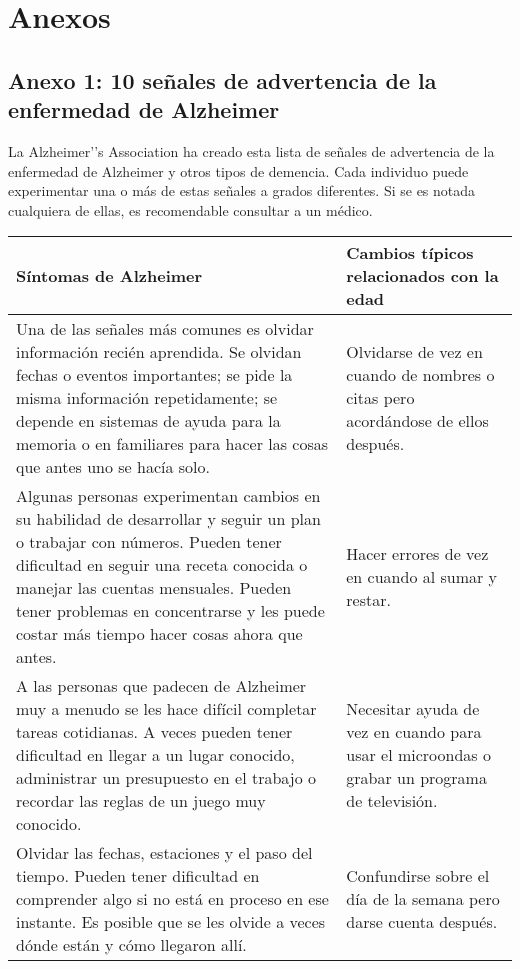 \documentclass[smallextended, 12pt]{article}
\begin{document}
	\section{Anexos}
	\subsection{Anexo 1: 10 se\~nales de advertencia de la enfermedad de Alzheimer}
	La Alzheimer'’s Association ha creado esta lista de se\~nales de advertencia de la enfermedad de Alzheimer y otros tipos de demencia. Cada individuo puede experimentar una o m\'as de estas se\~nales a grados diferentes. Si se es notada cualquiera de ellas, es recomendable consultar a un m\'edico. \cite{ref7}
	\begin{center}
		\begin{tabular}{|p{10cm}|p{7cm}|}
			\hline
			\textbf{S\'intomas de Alzheimer }&\textbf{ Cambios t\'ipicos relacionados con la edad} \\
			\hline
			
			Una de las se\~nales m\'as comunes es olvidar informaci\'on reci\'en aprendida. Se olvidan fechas o eventos importantes; se pide la misma informaci\'on repetidamente; se depende en sistemas de ayuda para la memoria o en familiares para hacer las cosas que antes uno se hac\'ia solo. & Olvidarse de vez en cuando de nombres o citas pero acord\'andose de ellos despu\'es. \\ \hline
			Algunas personas experimentan cambios en su habilidad de desarrollar y seguir un plan o trabajar con n\'umeros. Pueden tener dificultad en seguir una receta conocida o manejar las cuentas mensuales. Pueden tener problemas en concentrarse y les puede costar m\'as tiempo hacer cosas ahora que antes. & Hacer errores de vez en cuando al sumar y restar. \\ \hline
			
			A las personas que padecen de Alzheimer muy a menudo se les hace dif\'icil completar tareas cotidianas. A veces pueden tener dificultad en llegar a un lugar conocido, administrar un presupuesto en el trabajo o recordar las reglas de un juego muy conocido. & Necesitar ayuda de vez en cuando para usar el microondas o grabar un programa de televisi\'on. \\ \hline
			
			Olvidar las fechas, estaciones y el paso del tiempo. Pueden tener dificultad en comprender algo si no est\'a en proceso en ese instante. Es posible que se les olvide a veces d\'onde est\'an y c\'omo llegaron all\'i. & Confundirse sobre el d\'ia de la semana pero darse cuenta despu\'es.  \\ \hline
			

\end{tabular}
\end{center}
\end{document}
